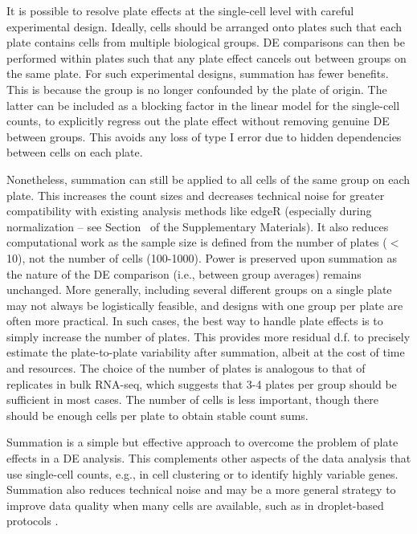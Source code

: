 \documentclass[oupdraft]{bio}
\begin{document}
It is possible to resolve plate effects at the single-cell level with careful experimental design.
Ideally, cells should be arranged onto plates such that each plate contains cells from multiple biological groups.
DE comparisons can then be performed within plates such that any plate effect cancels out between groups on the same plate.
For such experimental designs, summation has fewer benefits.
This is because the group is no longer confounded by the plate of origin.
The latter can be included as a blocking factor in the linear model for the single-cell counts, 
    to explicitly regress out the plate effect without removing genuine DE between groups.
This avoids any loss of type I error due to hidden dependencies between cells on each plate.

Nonetheless, summation can still be applied to all cells of the same group on each plate.
This increases the count sizes and decreases technical noise for greater compatibility with existing analysis methods like edgeR
    (especially during normalization -- see Section~\suppnorm{} of the Supplementary Materials).
It also reduces computational work as the sample size is defined from the number of plates ($<$ 10), not the number of cells (100-1000).
Power is preserved upon summation as the nature of the DE comparison (i.e., between group averages) remains unchanged.
More generally, including several different groups on a single plate may not always be logistically feasible, and designs with one group per plate are often more practical.
In such cases, the best way to handle plate effects is to simply increase the number of plates.
This provides more residual d.f. to precisely estimate the plate-to-plate variability after summation, albeit at the cost of time and resources.
The choice of the number of plates is analogous to that of replicates in bulk RNA-seq, which suggests that 3-4 plates per group should be sufficient in most cases.
The number of cells is less important, though there should be enough cells per plate to obtain stable count sums.

Summation is a simple but effective approach to overcome the problem of plate effects in a DE analysis. 
This complements other aspects of the data analysis that use single-cell counts, e.g., in cell clustering or to identify highly variable genes.
Summation also reduces technical noise and may be a more general strategy to improve data quality when many cells are available,
    such as in droplet-based protocols \citep{klein2015droplet,macosko2015highly}.
\end{document}
